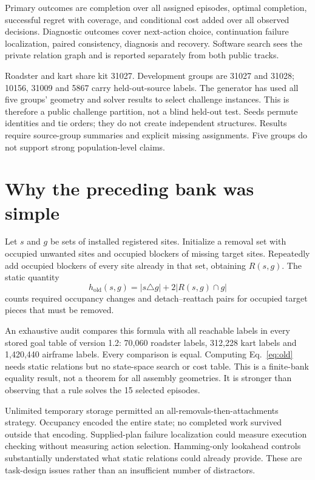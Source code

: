 \documentclass[10pt,twocolumn]{article}
\begin{document}
Primary outcomes are completion over all assigned episodes, optimal
completion, successful regret with coverage, and conditional cost added
over all observed decisions. Diagnostic outcomes cover next-action choice,
continuation failure localization, paired consistency, diagnosis and
recovery. Software search sees the private relation graph and is reported
separately from both public tracks.

Roadster and kart share kit 31027. Development groups are 31027 and 31028;
10156, 31009 and 5867 carry held-out-source labels. The generator has used
all five groups' geometry and solver results to select challenge instances.
This is therefore a public challenge partition, not a blind held-out test.
Seeds permute identities and tie orders; they do not create independent
structures. Results require source-group summaries and explicit missing
assignments. Five groups do not support strong population-level claims.

\section{Why the preceding bank was simple}
\label{sec:audit}
Let $s$ and $g$ be sets of installed registered sites. Initialize a removal
set with occupied unwanted sites and occupied blockers of missing target
sites. Repeatedly add occupied blockers of every site already in that set,
obtaining $R(s,g)$. The static quantity
\begin{equation}
h_{\mathrm{old}}(s,g)=|s\triangle g|+2|R(s,g)\cap g|
\label{eq:old}
\end{equation}
counts required occupancy changes and detach--reattach pairs for occupied
target pieces that must be removed.

An exhaustive audit compares this formula with all reachable labels in
every stored goal table of version 1.2: 70,060 roadster labels, 312,228 kart
labels and 1,420,440 airframe labels. Every comparison is equal.
Computing Eq.~\ref{eq:old} needs static relations but no state-space search
or cost table. This is a finite-bank equality result, not a theorem for all
assembly geometries. It is stronger than observing that a rule solves the
15 selected episodes.

Unlimited temporary storage permitted an all-removals-then-attachments
strategy. Occupancy encoded the entire state; no completed work survived
outside that encoding. Supplied-plan failure localization could measure
execution checking without measuring action selection. Hamming-only
lookahead controls substantially understated what static relations could
already provide. These are task-design issues rather than an insufficient
number of distractors.
\end{document}
